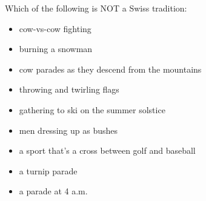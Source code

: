 Which of the following is NOT a Swiss tradition:
\begin{itemize}
\item cow-vs-cow fighting
\item burning a snowman
\item cow parades as they descend from the mountains
\item throwing and twirling flags
\item gathering to ski on the summer solstice
\item men dressing up as bushes
\item a sport that's a cross between golf and baseball
\item a turnip parade
\item a parade at 4 a.m.
\end{itemize}
